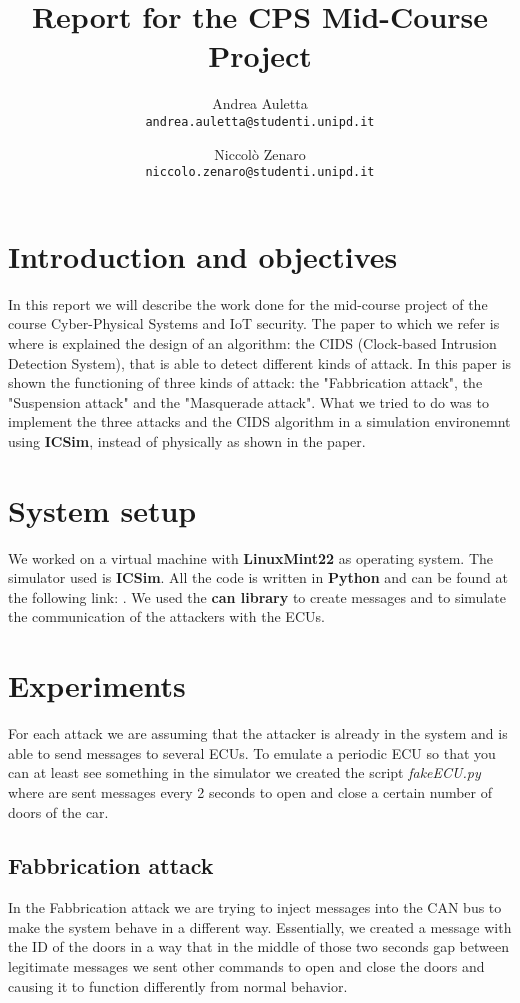 \documentclass[12pt]{article}
\title{Report for the CPS Mid-Course Project}
\author{
    Andrea Auletta \\ \texttt{andrea.auletta@studenti.unipd.it} \and
    Niccolò Zenaro \\ \texttt{niccolo.zenaro@studenti.unipd.it}
}
\begin{document}
\maketitle
\newpage
\tableofcontents
\newpage

\section{Introduction and objectives}
In this report we will describe the work done for the mid-course project of the course Cyber-Physical Systems and IoT security. 
The paper to which we refer is \textbf{\cite{Cho2016} } where is explained the design of an algorithm: the CIDS (Clock-based Intrusion Detection System), that is able to detect different kinds of attack. In this paper is shown the functioning of three kinds of attack: the "Fabbrication attack", the "Suspension attack" and the "Masquerade attack". What we tried to do was to implement the three attacks and the CIDS algorithm in a simulation environemnt using \textbf{ICSim}, instead of physically as shown in the paper.
\section{System setup}
We worked on a virtual machine with \textbf{LinuxMint22} as operating system.
The simulator used is \textbf{ICSim}. All the code is written in \textbf{Python} and can be found at the following link: .%
We used the \textbf{can library} to create messages and to simulate the communication of the attackers with the ECUs.
\section{Experiments}
For each attack we are assuming that the attacker is already in the system and is able to send messages to several ECUs. To emulate a periodic ECU so that you can at least see something in the simulator we created the script \textit{fakeECU.py} where are sent messages every 2 seconds to open and close a certain number of doors of the car.  
\subsection{Fabbrication attack}
In the Fabbrication attack we are trying to inject messages into the CAN bus to make the system behave in a different way. Essentially, we created a message with the ID of the doors in a way that in the middle of those two seconds gap between legitimate messages we sent other commands to open and close the doors and causing it to function differently from normal behavior.
\end{document}

